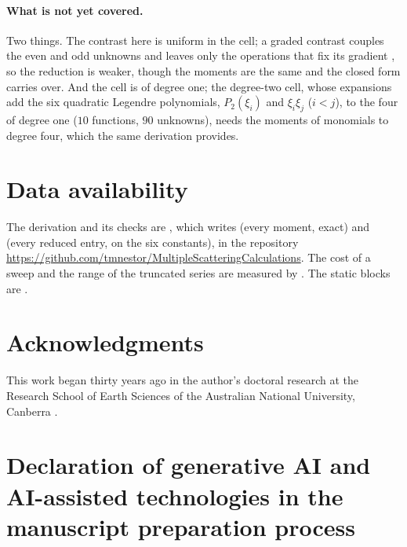 \documentclass[11pt,a4paper]{article}
\begin{document}
\paragraph{What is not yet covered.} Two things. The contrast here is uniform in the cell; a graded contrast couples the
even and odd unknowns and leaves only the operations that fix its gradient
\citep{NestorCoupling2026}, so the reduction is weaker, though the moments are the same and the closed
form carries over. And the cell is of degree one; the degree-two cell, whose expansions add the six quadratic Legendre polynomials, $P_2(\xi_i)$ and $\xi_i\xi_j$ ($i<j$), to the four of degree one ($10$ functions, $90$ unknowns), needs the moments of
monomials to degree four, which the same derivation provides.

\section*{Data availability}
The derivation and its checks are , which writes
 (every moment, exact) and  (every
reduced entry, on the six constants), in the repository
\url{https://github.com/tmnestor/MultipleScatteringCalculations}. The cost of a sweep and the range of the
truncated series are measured by . The static blocks are
.

\section*{Acknowledgments}
This work began thirty years ago in the author's doctoral research at the Research School of Earth
Sciences of the Australian National University, Canberra \citep{Nestor1996}.

\section*{Declaration of generative AI and AI-assisted technologies in the manuscript preparation process}
\end{document}
